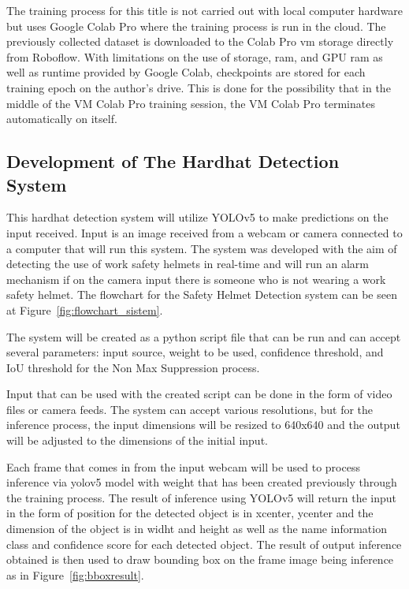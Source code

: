 \par The training process for this title is not carried out with local computer hardware but uses Google Colab Pro where the training process is run in the cloud. The previously collected dataset is downloaded to the Colab Pro vm storage directly from Roboflow. With limitations on the use of storage, ram, and GPU ram as well as runtime provided by Google Colab, checkpoints are stored for each training epoch on the author's drive. This is done for the possibility that in the middle of the VM Colab Pro training session, the VM Colab Pro terminates automatically on itself. 

\subsection{Development of The Hardhat Detection System}
\label{subsec:hedect_dev_sys}

\par This hardhat detection system will utilize YOLOv5 to make predictions on the input received. Input is an image received from a webcam or camera connected to a computer that will run this system. The system was developed with the aim of detecting the use of work safety helmets in real-time and will run an alarm mechanism if on the camera input there is someone who is not wearing a work safety helmet. The flowchart for the Safety Helmet Detection system can be seen at Figure~\ref{fig:flowchart_sistem}.

\par The system will be created as a python script file that can be run and can accept several parameters: input source, weight to be used, confidence threshold, and IoU threshold for the Non Max Suppression process.

\par Input that can be used with the created script can be done in the form of video files or camera feeds. The system can accept various resolutions, but for the inference process, the input dimensions will be resized to 640x640 and the output will be adjusted to the dimensions of the initial input.

\par Each frame that comes in from the input webcam will be used to process inference via
yolov5 model with weight that has been created previously through the training process.
The result of inference using YOLOv5 will return the input in the form of position for
the detected object is in xcenter, ycenter and the dimension of the object is in widht
and height as well as the name information class and confidence score for
each detected object. The result of output inference obtained is then used to draw
bounding box on the frame image being inference
as in Figure~\ref{fig:bboxresult}.

